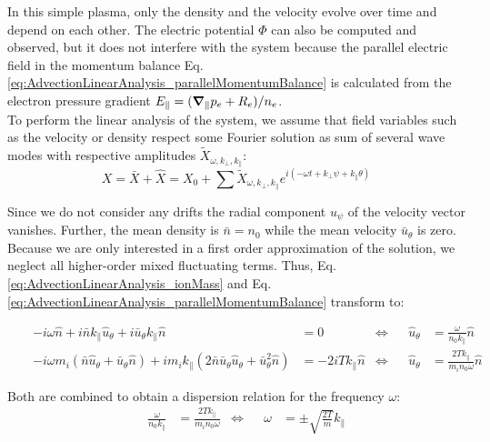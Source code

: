 In this simple plasma, only the density and the velocity evolve over time and depend on each other. The electric potential $\Phi$ can also be computed and observed, but it does not interfere with the system because the parallel electric field in the momentum balance Eq. \ref{eq:AdvectionLinearAnalysis_parallelMomentumBalance} is calculated from the electron pressure gradient $E_\parallel = (\grad_\parallel p_e + R_e) / n_e$. \\

To perform the linear analysis of the system, we assume that field variables such as the velocity or density respect some Fourier solution as sum of several wave modes with respective amplitudes $\tilde{X}_{\omega,k_\perp,k_\parallel}$:
\begin{equation}
	 X = \bar{X} + \hat{X} = X_0 + \sum\tilde{X}_{\omega,k_\perp,k_\parallel}e^{i(-\omega t + k_\perp \psi + k_\parallel \theta)} \label{eq:FourierModeSolution}
\end{equation}

Since we do not consider any drifts the radial component $u_\psi$ of the velocity vector vanishes. Further, the mean density is $\bar{n}=n_0$ while the mean velocity $\bar{u}_\theta$ is zero. Because we are only interested in a first order approximation of the solution, we neglect all higher-order mixed fluctuating terms. Thus, Eq. \ref{eq:AdvectionLinearAnalysis_ionMass} and Eq. \ref{eq:AdvectionLinearAnalysis_parallelMomentumBalance} transform to:

\begin{align*}
	&&-i\omega\hat{n} + i\bar{n}k_\parallel\hat{u}_\theta + i\bar{u}_\theta k_\parallel\hat{n} &= 0 &\Leftrightarrow&& \hat{u}_\theta &= \frac{\omega}{n_0k_\parallel}\hat{n} \\
	&& -i\omega m_i \left(\bar{n}\hat{u}_\theta + \bar{u}_\theta\hat{n}\right) + im_ik_\parallel\left(2\bar{n}\bar{u}_\theta\hat{u}_\theta + \bar{u}_\theta^2\hat{n}\right) &= -2iT k_\parallel\hat{n}	&\Leftrightarrow&&  \hat{u}_\theta &= \frac{2T k_\parallel}{m_in_0\omega}\hat{n}
\end{align*}

Both are combined to obtain a dispersion relation for the frequency $\omega$:
\begin{align}
	&& \frac{\omega}{n_0k_\parallel} &= \frac{2T k_\parallel}{m_in_0\omega} 
	&\Leftrightarrow&& \omega &= \pm\sqrt{\frac{2T}{m}}k_\parallel \label{eq:AdvectionLinearAnalysis_dispersionRelation}
\end{align}


